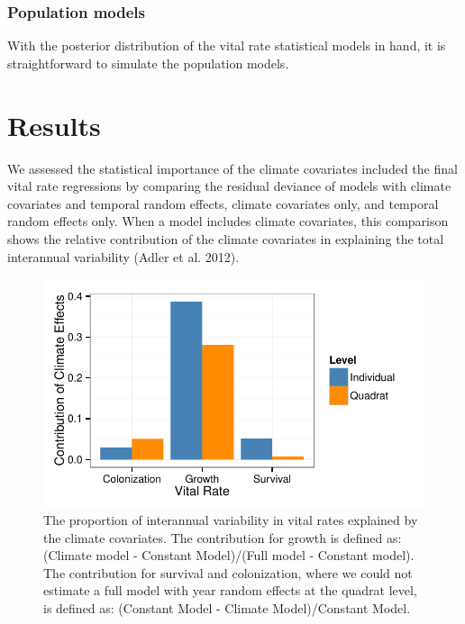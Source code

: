 \documentclass[12pt]{article}
\begin{document}
\subsubsection{Population models}
With the posterior distribution of the vital rate statistical models in hand, it is straightforward to simulate the population models.

\section{Results}
We assessed the statistical importance of the climate covariates included the final vital rate regressions by comparing the residual deviance of models with climate covariates and temporal random effects, climate covariates only, and temporal random effects only. When a model includes climate covariates, this comparison shows the relative contribution of the climate covariates in explaining the total interannual variability (Adler et al. 2012). 




\begin{figure}[th!]
\begin{center}
\includegraphics{Fig-DevFig}
\end{center}
\caption{The proportion of interannual variability in  vital rates explained by the climate covariates. The contribution for growth is defined as: (Climate model - Constant Model)/(Full model - Constant model). The contribution for survival and colonization, where we could not estimate a full model with year random effects at the quadrat level, is defined as: (Constant Model - Climate Model)/Constant Model.}
\label{fig:DevFig}
\end{figure}
\end{document}
